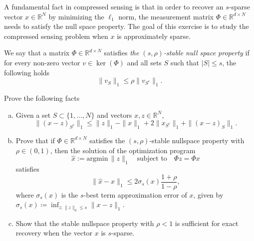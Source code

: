 \begin{myexercise}\label{prob:stable_nullspace_property}
     A fundamental fact in compressed sensing is that in order to recover an $s$-sparse vector $x \in \mathbb{R}^N$ by minimizing the $\ell_1$ norm, the measurement matrix $\Phi \in \mathbb{R}^{d\times N}$ needs to satisfy the null space property. The goal of this exercise is to study the compressed sensing problem when $x$ is approximately sparse.

    We say that a matrix $\Phi \in \mathbb{R}^{d\times N}$ satisfies \emph{the $(s,\rho)$-stable null space property} if for every non-zero vector $v \in \ker(\Phi)$ and all sets $S$ such that $|S|\le s$, the following holds
    \begin{equation*}
        \|v_{S}\|_1 \le \rho \|v_{S^c}\|_1.
    \end{equation*}

    Prove the following facts
    \begin{enumerate}[(a)]
        \item Given a set $S\subset \{1,\ldots,N\}$ and vectors $x,z \in \mathbb{R}^N$,
        \begin{equation*}
            \|(x-z)_{S^c}\|_1 \le \|z\|_1 - \|x\|_1  + 2\|x_{S^c}\|_1 + \|(x-z)_{S}\|_1.
        \end{equation*}
        \item Prove that if $\Phi \in \mathbb{R}^{d\times N}$ satisfies the $(s,\rho)$-stable nullspace property with $\rho \in (0,1)$, then the solution of the optimization program 
        \begin{equation*}
            \hat{x}:= \mathrm{argmin}\, \|z\|_1 \quad \text{subject to} \quad \Phi z=\Phi x
        \end{equation*}
        satisfies 
        \begin{equation*}
            \|\hat{x}-x\|_1 \le 2\sigma_s(x)\frac{1+\rho}{1-\rho},
        \end{equation*}
        where $\sigma_s(x)$ is the $s$-best term approximation error of $x$, given by $\sigma_s(x) \coloneqq \inf_{z:\|z\|_0 \le s} \|x-z\|_1$.
        \item Show that the stable nullspace property with $\rho<1$ is sufficient for exact recovery when the vector $x$ is $s$-sparse.
    \end{enumerate}
\end{myexercise}








